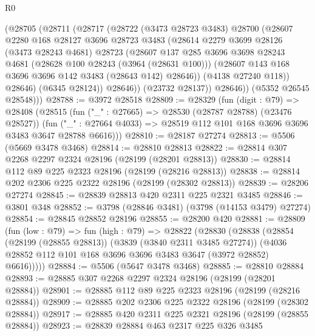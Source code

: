 \begin{lexlean}{R0}
\begin{coremodule}
            (@28705
              (@28711
                (@28717
                  (@28722
                    (@3473 @28723 @3483)
                    @28700
                    (@28607
                      @2280
                      @168
                      @28127
                      @3696
                      @28723
                      @3483
                      (@28614
                        @2279
                        @3699
                        @28126
                        (@3473 @28243 @4681)
                        @28723
                        (@28607
                          @137
                          @285
                          @3696
                          @3698
                          @28243
                          @4681
                          (@28628 @100 @28243 (@3964 (@28631 @100)))
                          (@28607 @143 @168 @3696 @3696 @142 @3483 (@28643 @142) @28646))
                        (@4138 @27240 @118))
                      @28646)
                    (@6345 @28124))
                  @28646))
              (@23732 @28137))
            @28646))
        (@5352 @26545 @28548)))
@28788 := @3972 @28518
@28809 := @28329
    (fun (digit : @79) =>
    @28408
      (@28515
        (fun ("_" : @27665) => @28530 (@28787 @28788) (@23476 @28527))
        (fun ("_" : @27664 @4033) => @28519 @112 @101 @168 @3696 @3696 @3483 @3647 @28788 @6616)))
@28810 := @28187 @27274
@28813 := @5506 (@5669 @3478 @3468)
@28814 := @28810 @28813
@28822 := @28814 @307 @2268 @2297 @2324 @28196 (@28199 (@28201 @28813))
@28830 := @28814 @112 @89 @225 @2323 @28196 (@28199 (@28216 @28813))
@28838 := @28814 @202 @2306 @225 @2322 @28196 (@28199 (@28302 @28813))
@28839 := @28206 @27274
@28845 := @28839 @28813 @420 @2311 @225 @2321 @3485
@28846 := @3801 @348
@28852 := @3798 (@28846 @3481) (@3798 (@14153 @3479) @27274)
@28854 := @28845 @28852 @28196
@28855 := @28200 @420
@28881 := @28809
    (fun (low : @79) =>
    fun (high : @79) =>
    @28822
      (@28830
        (@28838
          (@28854
            (@28199 (@28855 @28813))
            (@3839 (@3840 @2311 @3485 @27274))
            (@4036 @28852 @112 @101 @168 @3696 @3696 @3483 @3647 (@3972 @28852) @6616)))))
@28884 := @5506 (@5647 @3478 @3468)
@28885 := @28810 @28884
@28893 := @28885 @307 @2268 @2297 @2324 @28196 (@28199 (@28201 @28884))
@28901 := @28885 @112 @89 @225 @2323 @28196 (@28199 (@28216 @28884))
@28909 := @28885 @202 @2306 @225 @2322 @28196 (@28199 (@28302 @28884))
@28917 := @28885 @420 @2311 @225 @2321 @28196 (@28199 (@28855 @28884))
@28923 := @28839 @28884 @463 @2317 @225 @326 @3485

\end{coremodule}
\end{lexlean}
